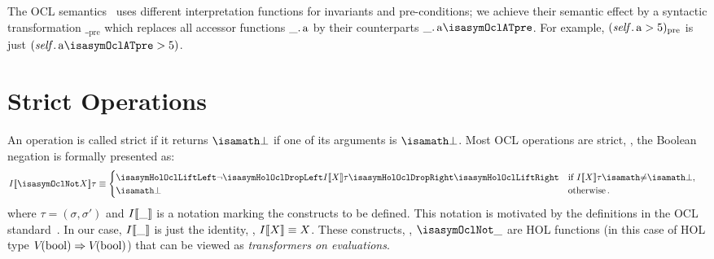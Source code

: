 The OCL semantics~\cite[Annex A]{omg:ocl:2003} uses different interpretation
functions for invariants and pre-conditions; we achieve their semantic effect by
a syntactic transformation $\__\text{pre}$ which replaces all accessor functions
$\getAttrib{\_}{a}$ by their counterparts
$\getAttrib{\_}{a\isasymOclATpre}$. For example, $(\getAttrib{\self}{a} >
5)_\text{pre}$ is just $(\getAttrib{\self}{a\isasymOclATpre} > 5)$.

\section{Strict Operations}%
\label{sec:strict-ops}%
An operation is called strict if it returns $\isasymbottom$ if one of its
arguments is $\isasymbottom$. Most {OCL} operations are strict, \eg, the
Boolean negation is formally presented as:
\begin{align*}
I\semantics{\isasymOclNot X}\tau & \equiv
  \begin{cases}
    \lift{\lnot \drop{I\semantics{X} \tau}}
    &\text{if $I\semantics{X}\tau\isasymnoteq\isasymbottom$}, \\
     \isasymbottom & \text{otherwise}\,.
   \end{cases}
\end{align*}
where $\tau = (\sigma, \sigma')$ and $I\llbracket \_ \rrbracket$ is a notation marking the
\holocl constructs to be defined. This notation is motivated by the definitions
in the {OCL} standard~\cite{omg:ocl:2003}. In our case, $I\llbracket \_ \rrbracket$ is
just the identity, \ie, $I\llbracket X \rrbracket\equiv X$.  These constructs, \ie,
$\isasymOclNot \_$ are HOL functions (in this case of HOL type
$V_{}({\mathrm{bool}}) \Rightarrow V_{}({\mathrm{bool}})$) that can be viewed as
\emph{transformers on evaluations}.

